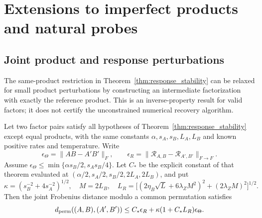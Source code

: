 \section{Extensions to imperfect products and natural probes}
\label{app:enhancement-theory}

\subsection{Joint product and response perturbations}

The same-product restriction in Theorem~\ref{thm:response_stability} can be
relaxed for small product perturbations by constructing an intermediate factorization with exactly
the reference product. This is an inverse-property result for valid factors;
it does not certify the unconstrained numerical recovery algorithm.

\begin{corollary}
\label{cor:joint-stability}
Let two factor pairs satisfy all hypotheses of
Theorem~\ref{thm:response_stability} except equal products, with the same
constants $\alpha,s_A,s_B,L_A,L_B$ and known positive rates and temperature.
Write
\[
 \epsilon_\Theta=\|AB-A'B'\|_F,\qquad
 \epsilon_R=\|\mathcal R_{A,B}-\mathcal R_{A',B'}\|_{F\to F}.
\]
Assume $\epsilon_\Theta\le\min\{\alpha s_B/2,s_A s_B/4\}$.
Let $C_*$ be the explicit constant of that theorem evaluated at
$(\alpha/2,s_A/2,s_B/2,2L_A,2L_B)$, and put
\[
 \kappa=(s_B^{-2}+4s_A^{-2})^{1/2},\quad M=2L_B,\quad
 L_R=\bigl[(2\eta_B\sqrt L+6\lambda_Z M^2)^2+(2\lambda_Z M)^2\bigr]^{1/2}.
\]
Then the joint Frobenius distance modulo a common permutation satisfies
\[
 d_{\rm perm}((A,B),(A',B'))
 \le C_*\epsilon_R+\kappa(1+C_*L_R)\epsilon_\Theta.
\]
\end{corollary}

